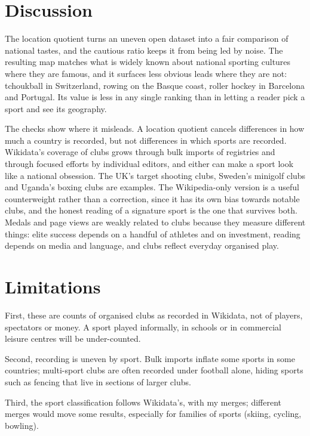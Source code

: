 \documentclass[11pt,a4paper]{article}
\begin{document}
\section{Discussion}

The location quotient turns an uneven open dataset into a fair comparison of national tastes, and the cautious ratio keeps it from being led by noise. The resulting map matches what is widely known about national sporting cultures where they are famous, and it surfaces less obvious leads where they are not: tchoukball in Switzerland, rowing on the Basque coast, roller hockey in Barcelona and Portugal. Its value is less in any single ranking than in letting a reader pick a sport and see its geography.

The checks show where it misleads. A location quotient cancels differences in how much a country is recorded, but not differences in which sports are recorded. Wikidata's coverage of clubs grows through bulk imports of registries and through focused efforts by individual editors, and either can make a sport look like a national obsession. The UK's target shooting clubs, Sweden's minigolf clubs and Uganda's boxing clubs are examples. The Wikipedia-only version is a useful counterweight rather than a correction, since it has its own bias towards notable clubs, and the honest reading of a signature sport is the one that survives both. Medals and page views are weakly related to clubs because they measure different things: elite success depends on a handful of athletes and on investment, reading depends on media and language, and clubs reflect everyday organised play.

\section{Limitations}

First, these are counts of organised clubs as recorded in Wikidata, not of players, spectators or money. A sport played informally, in schools or in commercial leisure centres will be under-counted.

Second, recording is uneven by sport. Bulk imports inflate some sports in some countries; multi-sport clubs are often recorded under football alone, hiding sports such as fencing that live in sections of larger clubs.

Third, the sport classification follows Wikidata's, with my merges; different merges would move some results, especially for families of sports (skiing, cycling, bowling).
\end{document}
